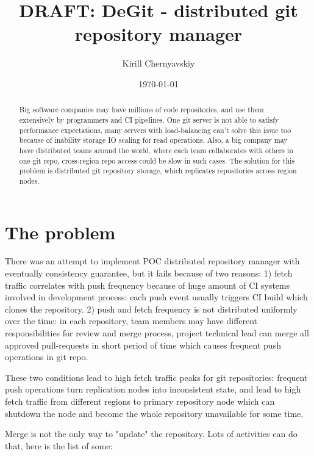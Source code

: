 \documentclass[12pt,oneside]{article}
\date{\small\today}
\title{%
  DRAFT: DeGit - distributed git repository manager\\
  \colorbox{firebrick}{\small\sffamily\color{white}{White Paper}}}
\author{Kirill Chernyavskiy}
\begin{document}
\raggedbottom

\maketitle
\begin{abstract}
Big software companies may have millions of code repositories,
and use them extensively by programmers and CI pipelines.
One git server is not able to satisfy performance expectations,
many servers with load-balancing can't solve this issue too because
of inability storage IO scaling for read operations.
Also, a big company may have distributed teams around the world,
where each team collaborates with others in one git repo,
cross-region repo access could be slow in such cases.
The solution for this problem is distributed git repository storage,
which replicates repositories across region nodes.
\end{abstract}


\section{The problem}

There was an attempt to implement POC distributed repository manager with
eventually consistency guarantee, but it fails because of two reasons:
1) fetch traffic correlates with push frequency because of huge amount of
CI systems involved in development process: each push event usually triggers
CI build which clones the repository.
2) push and fetch frequency is not distributed uniformly over the time: in each
repository, team members may have different responsibilities for review and merge process,
project technical lead can merge all approved pull-requests in short period of time
which causes frequent push operations in git repo.

These two conditions lead to high fetch traffic peaks for git repositories:
frequent push operations turn replication nodes into inconsistent state,
and lead to high fetch traffic from different regions to primary repository node
which can shutdown the node and become the whole repository unavailable for some time.

Merge is not the only way to "update" the repository. Lots of activities can do that,
here is the list of some:
\end{document}
